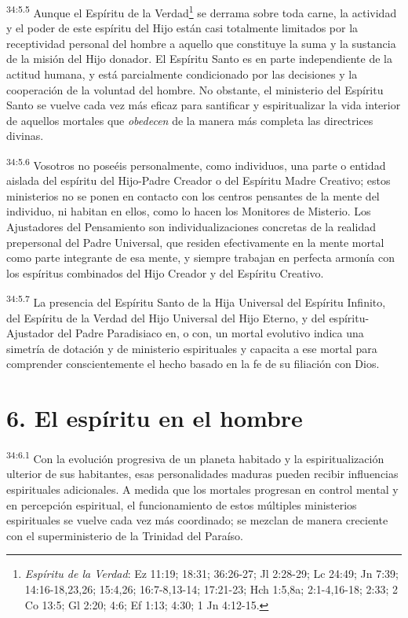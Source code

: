 \par
\textsuperscript{34:5.5} Aunque el Espíritu de la Verdad\footnote{\textit{Espíritu de la Verdad}: Ez 11:19; 18:31; 36:26-27; Jl 2:28-29; Lc 24:49; Jn 7:39; 14:16-18,23,26; 15:4,26; 16:7-8,13-14; 17:21-23; Hch 1:5,8a; 2:1-4,16-18; 2:33; 2 Co 13:5; Gl 2:20; 4:6; Ef 1:13; 4:30; 1 Jn 4:12-15.} se derrama sobre toda carne, la actividad y el poder de este espíritu del Hijo están casi totalmente limitados por la receptividad personal del hombre a aquello que constituye la suma y la sustancia de la misión del Hijo donador. El Espíritu Santo es en parte independiente de la actitud humana, y está parcialmente condicionado por las decisiones y la cooperación de la voluntad del hombre. No obstante, el ministerio del Espíritu Santo se vuelve cada vez más eficaz para santificar y espiritualizar la vida interior de aquellos mortales que \textit{obedecen} de la manera más completa las directrices divinas.

\par
\textsuperscript{34:5.6} Vosotros no poseéis personalmente, como individuos, una parte o entidad aislada del espíritu del Hijo-Padre Creador o del Espíritu Madre Creativo; estos ministerios no se ponen en contacto con los centros pensantes de la mente del individuo, ni habitan en ellos, como lo hacen los Monitores de Misterio. Los Ajustadores del Pensamiento son individualizaciones concretas de la realidad prepersonal del Padre Universal, que residen efectivamente en la mente mortal como parte integrante de esa mente, y siempre trabajan en perfecta armonía con los espíritus combinados del Hijo Creador y del Espíritu Creativo.

\par
\textsuperscript{34:5.7} La presencia del Espíritu Santo de la Hija Universal del Espíritu Infinito, del Espíritu de la Verdad del Hijo Universal del Hijo Eterno, y del espíritu-Ajustador del Padre Paradisiaco en, o con, un mortal evolutivo indica una simetría de dotación y de ministerio espirituales y capacita a ese mortal para comprender conscientemente el hecho basado en la fe de su filiación con Dios.

\section*{6. El espíritu en el hombre}
\par
\textsuperscript{34:6.1} Con la evolución progresiva de un planeta habitado y la espiritualización ulterior de sus habitantes, esas personalidades maduras pueden recibir influencias espirituales adicionales. A medida que los mortales progresan en control mental y en percepción espiritual, el funcionamiento de estos múltiples ministerios espirituales se vuelve cada vez más coordinado; se mezclan de manera creciente con el superministerio de la Trinidad del Paraíso.

